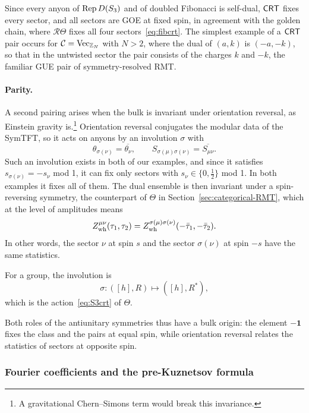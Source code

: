 \documentclass[11pt]{article}
\numberwithin{equation}{section}
\newcommand{\Zwh}{Z_{\rm wh}}
\begin{document}
Since every anyon of $\operatorname{Rep} D(S_3)$ and of doubled Fibonacci is self-dual, $\mathsf{CRT}$ fixes every sector, and all sectors are GOE at fixed spin, in agreement with the golden chain, where $\mathcal R\Theta$ fixes all four sectors~\eqref{eq:fibcrt}. The simplest example of a $\mathsf{CRT}$ pair occurs for $\mathcal C=\mathrm{Vec}_{\mathbb Z_N}$ with $N>2$, where the dual of $(a,k)$ is $(-a,-k)$, so that in the untwisted sector the pair consists of the charges $k$ and $-k$, the familiar GUE pair of symmetry-resolved RMT.

\paragraph{Parity.} A second pairing arises when the bulk is invariant under orientation reversal, as Einstein gravity is.\footnote{A gravitational Chern--Simons term would break this invariance.} Orientation reversal conjugates the modular data of the SymTFT, so it acts on anyons by an involution $\sigma$ with
\begin{equation}\label{eq:sigma}
\theta_{\sigma(\nu)}=\overline{\theta_\nu},\qquad S_{\sigma(\mu)\sigma(\nu)}=\overline{S_{\mu\nu}}.
\end{equation}
Such an involution exists in both of our examples, and since it satisfies $s_{\sigma(\nu)}=-s_\nu$ mod 1, it can fix only sectors with $s_\nu\in\{0,\tfrac12\}$ mod 1. In both examples it fixes all of them. The dual ensemble is then invariant under a spin-reversing symmetry, the counterpart of $\Theta$ in Section~\ref{sec:categorical-RMT}, which at the level of amplitudes means
\begin{equation}\label{eq:Zsigma}
\Zwh^{\mu\nu}(\tau_1,\tau_2)=\Zwh^{\sigma(\mu)\sigma(\nu)}(-\bar\tau_1,-\bar\tau_2).
\end{equation}
In other words, the sector $\nu$ at spin $s$ and the sector $\sigma(\nu)$ at spin $-s$ have the same statistics.

For a group, the involution is
\begin{equation}\label{eq:sigmaG}
\sigma:([h],R)\longmapsto([h],R^*),
\end{equation}
which is the action~\eqref{eq:S3crt} of $\Theta$. 

Both roles of the antiunitary symmetries thus have a bulk origin: the element $-\mathbf 1$ fixes the class and the pairs at equal spin, while orientation reversal relates the statistics of sectors at opposite spin.


\subsubsection{Fourier coefficients and the pre-Kuznetsov formula}\label{sec:fourier}
\end{document}
